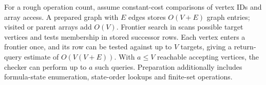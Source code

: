 For a rough operation count, assume constant-cost comparisons of vertex IDs
and array access. A prepared graph with $E$ edges stores $O(V+E)$ graph
entries; visited or parent arrays add $O(V)$. Frontier search in
 scans possible target vertices and tests
membership in stored successor rows. Each vertex enters a frontier once,
and its row can be tested against up to $V$ targets, giving a return-query
estimate of $O(V(V+E))$. With $a\le V$ reachable accepting vertices, the
checker can perform up to $a$ such queries. Preparation additionally includes
formula-state enumeration, state-order lookups and finite-set operations.
\clearpage
